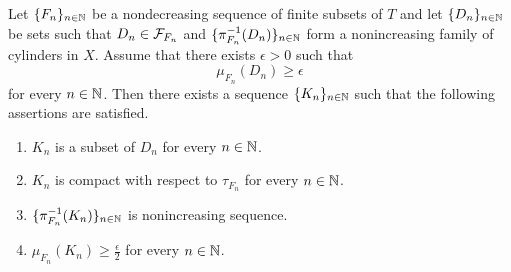 \begin{lemma}\label{lemma:inner_regularity_in_Daniell_Kolmogorov_extension}
Let $\{F_n\}_{n\in {\mathbb N}}$ be a nondecreasing sequence of finite subsets of $T$ and let $\{D_n\}_{n\in {\mathbb N}}$ be sets such that $D_n\in {\mathcal F}_{F_n}$ and $\{\pi_{F_n}^{-1}(D_n)\}_{n\in {\mathbb N}}$ form a nonincreasing family of cylinders in $X$. Assume that there exists $\epsilon > 0$ such that 
$$\mu_{F_n}(D_n) \geq \epsilon$$
for every $n\in {\mathbb N}$. Then there exists a sequence $\{K_n\}_{n\in {\mathbb N}}$ such that the following assertions are satisfied.
\begin{enumerate}[label=\emph{\textbf{(\arabic*)}}, leftmargin=*]
\item $K_n$ is a subset of $D_n$ for every $n\in {\mathbb N}$.
\item $K_n$ is compact with respect to $\tau_{F_n}$ for every $n\in {\mathbb N}$.
\item $\{\pi^{-1}_{F_n}(K_n)\}_{n\in {\mathbb N}}$ is nonincreasing sequence.
\item $\mu_{F_n}(K_n) \geq \frac{\epsilon}{2}$ for every $n\in {\mathbb N}$.
\end{enumerate}
\end{lemma}
